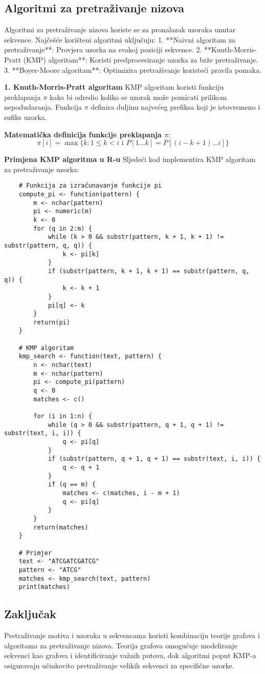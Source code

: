 \documentclass[10pt,a4paper,twoside]{article}
\begin{document}
\subsection*{Algoritmi za pretraživanje nizova}

Algoritmi za pretraživanje nizova koriste se za pronalazak uzoraka unutar sekvence. Najčešće korišteni algoritmi uključuju:
1. **Naivni algoritam za pretraživanje**: Provjera uzorka na svakoj poziciji sekvence.
2. **Knuth-Morris-Pratt (KMP) algoritam**: Koristi predprocesiranje uzorka za brže pretraživanje.
3. **Boyer-Moore algoritam**: Optimizira pretraživanje koristeći pravila pomaka.

\textbf{1. Knuth-Morris-Pratt algoritam}  
KMP algoritam koristi funkciju preklapanja \( \pi \) kako bi odredio koliko se uzorak može pomicati prilikom nepodudaranja. Funkcija \( \pi \) definira duljinu najvećeg prefiksa koji je istovremeno i sufiks uzorka.

\textbf{Matematička definicija funkcije preklapanja \( \pi \)}:
\[
\pi[i] = \max\{k : 1 \leq k < i \text{ i } P[1 \ldots k] = P[(i-k+1) \ldots i]\}
\]

\textbf{Primjena KMP algoritma u R-u}  
Sljedeći kod implementira KMP algoritam za pretraživanje uzorka:
\begin{verbatim}
	# Funkcija za izračunavanje funkcije pi
	compute_pi <- function(pattern) {
		m <- nchar(pattern)
		pi <- numeric(m)
		k <- 0
		for (q in 2:m) {
			while (k > 0 && substr(pattern, k + 1, k + 1) != substr(pattern, q, q)) {
				k <- pi[k]
			}
			if (substr(pattern, k + 1, k + 1) == substr(pattern, q, q)) {
				k <- k + 1
			}
			pi[q] <- k
		}
		return(pi)
	}
	
	# KMP algoritam
	kmp_search <- function(text, pattern) {
		n <- nchar(text)
		m <- nchar(pattern)
		pi <- compute_pi(pattern)
		q <- 0
		matches <- c()
		
		for (i in 1:n) {
			while (q > 0 && substr(pattern, q + 1, q + 1) != substr(text, i, i)) {
				q <- pi[q]
			}
			if (substr(pattern, q + 1, q + 1) == substr(text, i, i)) {
				q <- q + 1
			}
			if (q == m) {
				matches <- c(matches, i - m + 1)
				q <- pi[q]
			}
		}
		return(matches)
	}
	
	# Primjer
	text <- "ATCGATCGATCG"
	pattern <- "ATCG"
	matches <- kmp_search(text, pattern)
	print(matches)
\end{verbatim}

\subsection*{Zaključak}

Pretraživanje motiva i uzoraka u sekvencama koristi kombinaciju teorije grafova i algoritama za pretraživanje nizova. Teorija grafova omogućuje modeliranje sekvenci kao grafova i identificiranje važnih putova, dok algoritmi poput KMP-a osiguravaju učinkovito pretraživanje velikih sekvenci za specifične uzorke.



	
	
\end{document}
